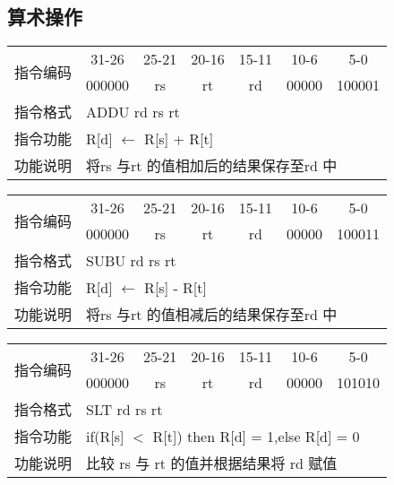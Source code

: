 \documentclass[a4paper,UTF8,fntef]{ctexart}
\begin{document}
\subsection{算术操作}
	\begin{table}[!hbp]
		\centering
		\begin{tabular}{|c|c|c|c|c|c|c|}
		\hline
		\multirow{2}{*}{指令编码} & 31-26&25-21 & 20-16&15-11 &10-6 &5-0\\
		\cline{2-7} & 000000 & rs & rt & rd & 00000 & 100001 \\
		\hline
		指令格式&\multicolumn{6}{|l|}{ADDU rd rs rt}\\
		\hline		
		指令功能&\multicolumn{6}{|l|}{R[d] $\leftarrow$ R[s] + R[t]}\\
		\hline		
		功能说明&\multicolumn{6}{|l|}{将rs 与rt 的值相加后的结果保存至rd 中}\\
		\hline
		\end{tabular}
	\end{table}
	\begin{table}[!hbp]
		\centering
		\begin{tabular}{|c|c|c|c|c|c|c|}
		\hline
		\multirow{2}{*}{指令编码} & 31-26&25-21 & 20-16&15-11 &10-6 &5-0\\
		\cline{2-7} & 000000 & rs & rt & rd & 00000 & 100011 \\
		\hline
		指令格式&\multicolumn{6}{|l|}{SUBU rd rs rt}\\
		\hline		
		指令功能&\multicolumn{6}{|l|}{R[d] $\leftarrow$ R[s] - R[t]}\\
		\hline		
		功能说明&\multicolumn{6}{|l|}{将rs 与rt 的值相减后的结果保存至rd 中}\\
		\hline
		\end{tabular}
	\end{table}
	\begin{table}[!hbp]
		\centering
		\begin{tabular}{|c|c|c|c|c|c|c|}
		\hline
		\multirow{2}{*}{指令编码} & 31-26&25-21 & 20-16&15-11 &10-6 &5-0\\
		\cline{2-7} & 000000 & rs & rt & rd & 00000 & 101010 \\
		\hline
		指令格式&\multicolumn{6}{|l|}{SLT rd rs rt}\\
		\hline		
		指令功能&\multicolumn{6}{|l|}{if(R[s] $<$ R[t]) then R[d] = 1,else R[d] = 0}\\
		\hline		
		功能说明&\multicolumn{6}{|l|}{比较 rs 与 rt 的值并根据结果将 rd 赋值}\\
		\hline
		\end{tabular}
	\end{table}
\end{document}
